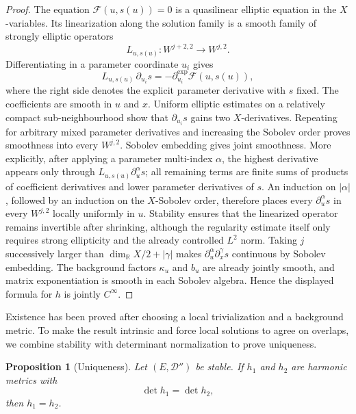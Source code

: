 \documentclass[11pt,reqno]{amsart}
\newtheorem{proposition}[theorem]{Proposition}
\theoremstyle{definition}
\theoremstyle{remark}
\newcommand{\R}{\mathbb R}
\newcommand{\cD}{\mathcal D}
\newcommand{\cF}{\mathcal F}
\begin{document}
\begin{proof}
The equation $\cF(u,s(u))=0$ is a quasilinear elliptic equation in the $X$-variables.  Its linearization along the solution family is a smooth family of strongly elliptic operators
\[
  L_{u,s(u)}:W^{j+2,2}\to W^{j,2}.
\]
Differentiating in a parameter coordinate $u_i$ gives
\begin{equation}\label{eq:differentiate-family-equation}
  L_{u,s(u)}\,\partial_{u_i}s
  =-\partial_{u_i}^{\mathrm{exp}}\cF(u,s(u)),
\end{equation}
where the right side denotes the explicit parameter derivative with $s$ fixed.  The coefficients are smooth in $u$ and $x$.  Uniform elliptic estimates on a relatively compact sub-neighbourhood show that $\partial_{u_i}s$ gains two $X$-derivatives.  Repeating for arbitrary mixed parameter derivatives and increasing the Sobolev order proves smoothness into every $W^{j,2}$.  Sobolev embedding gives joint smoothness.
More explicitly, after applying a parameter multi-index $\alpha$, the
highest derivative appears only through
$L_{u,s(u)}\partial_u^\alpha s$; all remaining terms are finite sums of
products of coefficient derivatives and lower parameter derivatives of
$s$.  An induction on $|\alpha|$, followed by an induction on the
$X$-Sobolev order, therefore places every $\partial_u^\alpha s$ in
every $W^{j,2}$ locally uniformly in $u$.  Stability ensures that the
linearized operator remains invertible after shrinking, although the
regularity estimate itself only requires strong ellipticity and the
already controlled $L^2$ norm.  Taking $j$ successively larger than
$\dim_\R X/2+|\gamma|$ makes
$\partial_u^\alpha\partial_x^\gamma s$ continuous by Sobolev embedding.
The background factors $\kappa_u$ and $b_u$ are already jointly smooth,
and matrix exponentiation is smooth in each Sobolev algebra.  Hence the
displayed formula for $h$ is jointly $C^\infty$.
\end{proof}


Existence has been proved after choosing a local trivialization and a
background metric.  To make the result intrinsic and force local
solutions to agree on overlaps, we combine stability with determinant
normalization to prove uniqueness.

\begin{proposition}[Uniqueness]\label{prop:normalized-uniqueness}
Let $(E,\cD'')$ be stable.  If $h_1$ and $h_2$ are harmonic metrics with
\[
  \det h_1=\det h_2,
\]
then $h_1=h_2$.
\end{proposition}
\end{document}
